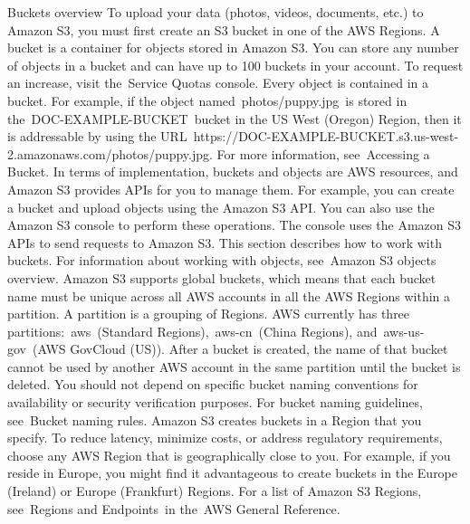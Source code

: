 Buckets overview
To upload your data (photos, videos, documents, etc.) to Amazon S3, you must first create an S3 bucket in one of the AWS Regions.
A bucket is a container for objects stored in Amazon S3. You can store any number of objects in a bucket and can have up to 100 buckets in your account. To request an increase, visit the Service Quotas console.
Every object is contained in a bucket. For example, if the object named photos/puppy.jpg is stored in the DOC-EXAMPLE-BUCKET bucket in the US West (Oregon) Region, then it is addressable by using the URL https://DOC-EXAMPLE-BUCKET.s3.us-west-2.amazonaws.com/photos/puppy.jpg. For more information, see Accessing a Bucket.
In terms of implementation, buckets and objects are AWS resources, and Amazon S3 provides APIs for you to manage them. For example, you can create a bucket and upload objects using the Amazon S3 API. You can also use the Amazon S3 console to perform these operations. The console uses the Amazon S3 APIs to send requests to Amazon S3.
This section describes how to work with buckets. For information about working with objects, see Amazon S3 objects overview.
Amazon S3 supports global buckets, which means that each bucket name must be unique across all AWS accounts in all the AWS Regions within a partition. A partition is a grouping of Regions. AWS currently has three partitions: aws (Standard Regions), aws-cn (China Regions), and aws-us-gov (AWS GovCloud (US)).
After a bucket is created, the name of that bucket cannot be used by another AWS account in the same partition until the bucket is deleted. You should not depend on specific bucket naming conventions for availability or security verification purposes. For bucket naming guidelines, see Bucket naming rules.
Amazon S3 creates buckets in a Region that you specify. To reduce latency, minimize costs, or address regulatory requirements, choose any AWS Region that is geographically close to you. For example, if you reside in Europe, you might find it advantageous to create buckets in the Europe (Ireland) or Europe (Frankfurt) Regions. For a list of Amazon S3 Regions, see Regions and Endpoints in the AWS General Reference.
